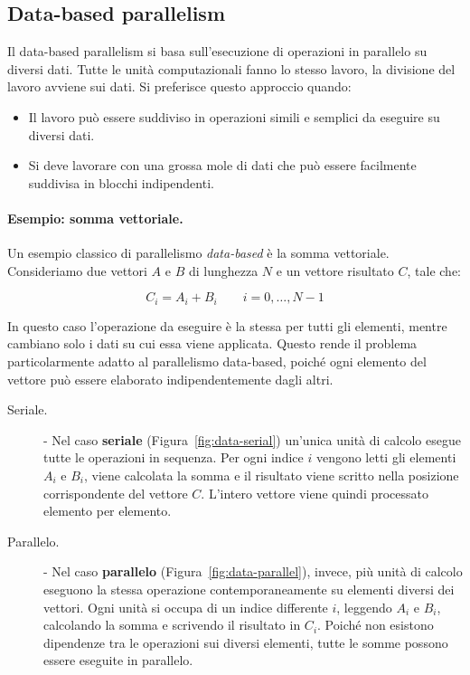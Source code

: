 \subsection{Data-based parallelism}
Il data-based parallelism si basa sull'esecuzione di operazioni in parallelo su diversi dati. Tutte le unità computazionali fanno lo stesso lavoro, la divisione del lavoro avviene sui dati.  Si preferisce questo approccio quando:
\begin{itemize}
    \item Il lavoro può essere suddiviso in operazioni simili e semplici da eseguire su diversi dati.
    \item Si deve lavorare con una grossa mole di dati che può essere facilmente suddivisa in blocchi indipendenti.
\end{itemize}

\paragraph{Esempio: somma vettoriale.}

Un esempio classico di parallelismo \emph{data-based} è la somma vettoriale. 
Consideriamo due vettori $A$ e $B$ di lunghezza $N$ e un vettore risultato $C$, tale che:

\[
C_i = A_i + B_i \qquad i = 0, \dots, N-1
\]

In questo caso l'operazione da eseguire è la stessa per tutti gli elementi, mentre cambiano solo i dati su cui essa viene applicata. 
Questo rende il problema particolarmente adatto al parallelismo data-based, poiché ogni elemento del vettore può essere elaborato indipendentemente dagli altri.

\begin{description}
    \item[Seriale.] -  Nel caso \textbf{seriale} (Figura~\ref{fig:data-serial}) un'unica unità di calcolo esegue tutte le operazioni in sequenza. Per ogni indice $i$ vengono letti gli elementi $A_i$ e $B_i$, viene calcolata la somma e il risultato viene scritto nella posizione corrispondente del vettore $C$.  L'intero vettore viene quindi processato elemento per elemento.
    \item[Parallelo.] - Nel caso \textbf{parallelo} (Figura~\ref{fig:data-parallel}), invece, più unità di calcolo eseguono la stessa operazione contemporaneamente su elementi diversi dei vettori. 
    Ogni unità si occupa di un indice differente $i$, leggendo $A_i$ e $B_i$, calcolando la somma e scrivendo il risultato in $C_i$. 
    Poiché non esistono dipendenze tra le operazioni sui diversi elementi, tutte le somme possono essere eseguite in parallelo.  
\end{description}

